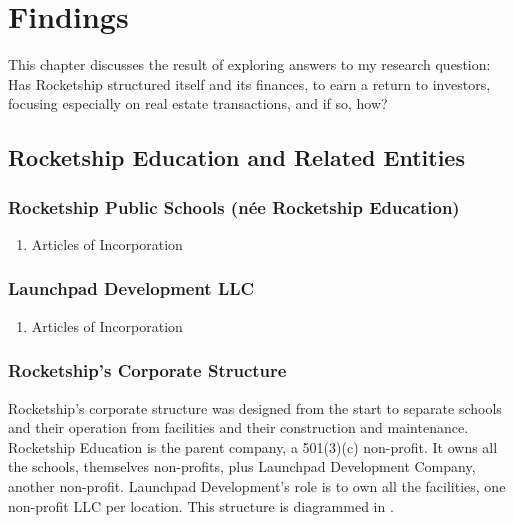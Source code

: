 
\chapter{Findings}\label{ch:results}\noindent
\bigskip%

This chapter discusses the result of exploring answers to my research question: Has Rocketship structured itself and its finances, to earn a return to investors, focusing especially on real estate transactions, and if so, how?

\section{Rocketship Education and Related Entities}
\subsection{Rocketship Public Schools (née Rocketship Education)}
\begin{enumerate}
  \item Articles of Incorporation
\end{enumerate}
\subsection{Launchpad Development LLC}
\begin{enumerate}
  \item Articles of Incorporation
\end{enumerate}

\subsection{Rocketship's Corporate Structure}\label{sec:rocketship-corp-struct}\indent

Rocketship's corporate structure was designed from the start to separate schools and their operation from facilities and their construction and maintenance. Rocketship Education is the parent company, a 501(3)(c) non-profit. It owns all the schools, themselves non-profits, plus Launchpad Development Company, another non-profit. Launchpad Development's role is to own all the facilities, one non-profit LLC per location. This structure is diagrammed in .

